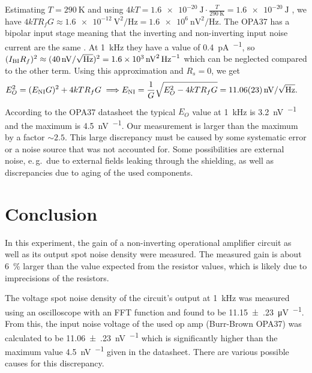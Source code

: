 \documentclass[a4paper]{scrartcl}
\begin{document}
Estimating $T=\SI{290}{\K}$ and using $4kT = \SI{1.6e-20}{\J} \cdot \frac{T}{\SI{290}{\K}} = \SI{1.6e-20}{\J}$
\cite{noise-analysis}, we have $4kTR_fG \approx \SI{1.6e-12}{\V\squared\per\Hz} = \SI{1.6e+6}{\nV\squared\per\Hz}$.
The OPA37 has a bipolar input stage meaning that the inverting and non-inverting input noise current are the
same \cite{noise-analysis}. At \SI{1}{\kHz} they have a value of \SI{0.4}{\pA\per\sqrt{\Hz}},
so $(I_\text{BI}R_f)^2 \approx (\SI{40}{\nV\per\sqrt{\Hz}})^2 = \SI{1.6e3}{\nV\squared\per\Hz}$
which can be neglected compared to the other term. Using this approximation and $R_s = 0$, we get
\begin{align*}
  E_O^2 = (E_\text{NI}G)^2 + 4kTR_fG
  \implies &E_\text{NI} = \frac{1}{G}\sqrt{E_O^2 - 4kTR_fG} = \SI{11.06(23)}{\nV\per\sqrt{\Hz}}.
\end{align*}
According to the OPA37 datasheet \cite{datasheet} the typical $E_O$ value at \SI{1}{\kHz} is \SI{3.2}{\nV\per\sqrt{\Hz}}
and the maximum is \SI{4.5}{\nV\per\sqrt{\Hz}}. Our measurement is larger than the maximum by a factor $\sim 2.5$.
This large discrepancy must be caused by some systematic error or a noise source that was not accounted for.
Some possibilities are external noise, e.\,g.\ due to external fields
leaking through the shielding, as well as discrepancies due to aging of the used components.



\section{Conclusion}
In this experiment, the gain of a non-inverting operational amplifier circuit as well as its output spot noise density
were measured. The measured gain is about \SI{6}{\percent} larger than the value expected from the resistor values,
which is likely due to imprecisions of the resistors.

The voltage spot noise density of the circuit's output at \SI{1}{\kHz} was measured using an oscilloscope with an FFT function
and found to be \SI{11.15(23)}{\uV\per\sqrt{\Hz}}. From this, the input noise voltage of the used op amp (Burr-Brown OPA37)
was calculated to be \SI{11.06(23)}{\nV\per\sqrt{\Hz}} which is significantly higher than the maximum value
\SI{4.5}{\nV\per\sqrt{\Hz}} given in the datasheet. There are various possible causes for this discrepancy.



\vfill
\printbibliography
\end{document}
